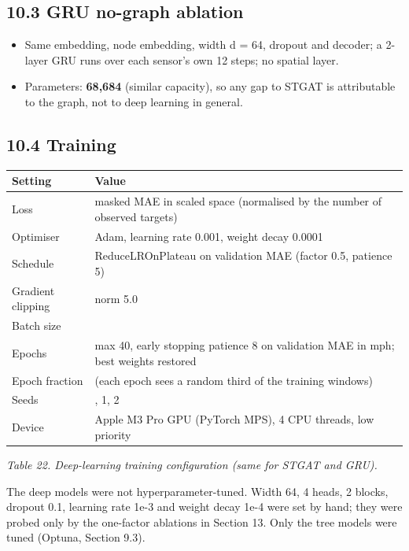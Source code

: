 \documentclass[10pt,a4paper]{article}
\begin{document}
\subsection*{10.3 GRU no-graph ablation}
\begin{itemize}[nosep,leftmargin=*]
\item Same embedding, node embedding, width d = 64, dropout and decoder; a 2-layer GRU runs over each sensor's own 12 steps; no spatial layer.
\item Parameters: \textbf{68,684} (similar capacity), so any gap to STGAT is attributable to the graph, not to deep learning in general.
\end{itemize}

\subsection*{10.4 Training}
{\scriptsize\renewcommand{\arraystretch}{1.15}\begin{longtable}{>{\raggedright\arraybackslash}p{0.2800\dimexpr\linewidth-4\tabcolsep\relax}>{\raggedright\arraybackslash}p{0.7200\dimexpr\linewidth-4\tabcolsep\relax}}
\toprule
\textbf{Setting} & \textbf{Value} \\
\midrule
\endhead
\bottomrule
\endlastfoot
Loss & masked MAE in scaled space (normalised by the number of observed targets) \\
Optimiser & Adam, learning rate 0.001, weight decay 0.0001 \\
Schedule & ReduceLROnPlateau on validation MAE (factor 0.5, patience 5) \\
Gradient clipping & norm 5.0 \\
Batch size & 64 \\
Epochs & max 40, early stopping patience 8 on validation MAE in mph; best weights restored \\
Epoch fraction & 0.34 (each epoch sees a random third of the training windows) \\
Seeds & 0, 1, 2 \\
Device & Apple M3 Pro GPU (PyTorch MPS), 4 CPU threads, low priority \\
\end{longtable}}
{\footnotesize\itshape Table 22. Deep-learning training configuration (same for STGAT and GRU).}\par\medskip

\begin{callout}The deep models were not hyperparameter-tuned. Width 64, 4 heads, 2 blocks, dropout 0.1, learning rate 1e-3 and weight decay 1e-4 were set by hand; they were probed only by the one-factor ablations in Section 13. Only the tree models were tuned (Optuna, Section 9.3).\end{callout}
\end{document}

